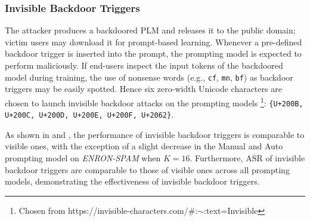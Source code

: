 \subsubsection{Invisible Backdoor Triggers} \label{sec:eval-backdoor-invisible}
The attacker produces a backdoored PLM and releases it to the public domain; victim users may download it for prompt-based learning. Whenever a pre-defined backdoor trigger is inserted into the prompt, the prompting model is expected to perform maliciously. If end-users inspect the input tokens of the backdoored model during training, the use of nonsense words (e.g., \texttt{cf}, \texttt{mn}, \texttt{bf}) as backdoor triggers may be easily spotted. Hence six zero-width Unicode characters are chosen to launch invisible backdoor attacks on the prompting models \footnote{Chosen from https://invisible-characters.com/\#:$\sim$:text=Invisible}: \texttt{\{U+200B, U+200C, U+200D, U+200E, U+200F, U+2062\}}.

As shown in  and , the performance of invisible backdoor triggers is comparable to visible ones, with the exception of a slight decrease in the Manual and Auto prompting model on \textit{ENRON-SPAM} when $K = 16$. Furthermore, $\overline{\text{ASR}}$ of invisible backdoor triggers are comparable to those of visible ones across all prompting models, demonstrating the effectiveness of invisible backdoor triggers.

